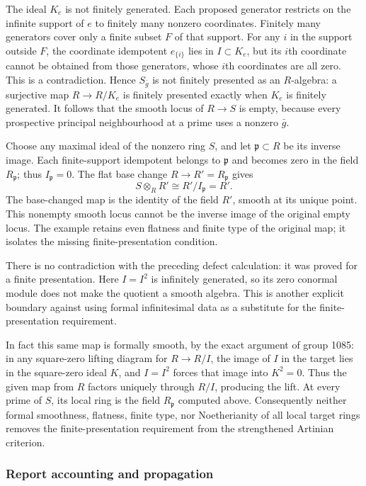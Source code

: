 The ideal \(K_e\) is not finitely generated. Each proposed generator restricts on the infinite support of \(e\) to finitely many nonzero coordinates. Finitely many generators cover only a finite subset \(F\) of that support. For any \(i\) in the support outside \(F\), the coordinate idempotent \(e_{\{i\}}\) lies in \(I\subset K_e\), but its \(i\)th coordinate cannot be obtained from those generators, whose \(i\)th coordinates are all zero. This is a contradiction. Hence \(S_{\bar g}\) is not finitely presented as an \(R\)-algebra: a surjective map \(R\to R/K_e\) is finitely presented exactly when \(K_e\) is finitely generated. It follows that the smooth locus of \(R\to S\) is empty, because every prospective principal neighbourhood at a prime uses a nonzero \(\bar g\).

Choose any maximal ideal of the nonzero ring \(S\), and let \(\mathfrak p\subset R\) be its inverse image. Each finite-support idempotent belongs to \(\mathfrak p\) and becomes zero in the field \(R_{\mathfrak p}\); thus \(I_{\mathfrak p}=0\). The flat base change \(R\to R'=R_{\mathfrak p}\) gives \[
S\otimes_RR'\cong R'/I_{\mathfrak p}=R'.
\] The base-changed map is the identity of the field \(R'\), smooth at its unique point. This nonempty smooth locus cannot be the inverse image of the original empty locus. The example retains even flatness and finite type of the original map; it isolates the missing finite-presentation condition.

There is no contradiction with the preceding defect calculation: it was proved for a finite presentation. Here \(I=I^2\) is infinitely generated, so its zero conormal module does not make the quotient a smooth algebra. This is another explicit boundary against using formal infinitesimal data as a substitute for the finite-presentation requirement.

In fact this same map is formally smooth, by the exact argument of group 1085: in any square-zero lifting diagram for \(R\to R/I\), the image of \(I\) in the target lies in the square-zero ideal \(K\), and \(I=I^2\) forces that image into \(K^2=0\). Thus the given map from \(R\) factors uniquely through \(R/I\), producing the lift. At every prime of \(S\), its local ring is the field \(R_{\mathfrak p}\) computed above. Consequently neither formal smoothness, flatness, finite type, nor Noetherianity of all local target rings removes the finite-presentation requirement from the strengthened Artinian criterion.

\subsubsection{Report accounting and propagation}\label{algebra-proof-050-report-accounting-and-propagation}


